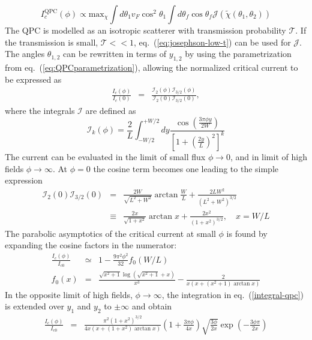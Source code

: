 \begin{equation}
I_c^{\text{QPC}}(\phi) \propto \text{max}_{\chi} \int d \theta_1 v_F \cos^2 \theta_1 \int d \theta_f \cos \theta_f \mathcal{J}\left( \tilde{\chi} (\theta_1, \theta_2) \right)
\end{equation}
The QPC is modelled as an isotropic scatterer with transmission probability $\mathcal{T}$. If the transmission is small, $\mathcal{T} << 1$, eq.~(\ref{eq:josephson-low-t}) can be used for $\mathcal{J}$.
The angles $\theta_{1, 2}$ can be rewritten in terms of $y_{1, 2}$ by using the parametrization from eq.~(\ref{eq:QPCparametrization}), allowing the normalized critical current to be expressed as
\begin{eqnarray}
\frac{I_c(\phi)}{I_c(0)} &=& \frac{\mathcal{I}_2(\phi)\mathcal{I}_{3/2}(\phi)}{\mathcal{I}_2(0)\mathcal{I}_{3/2}(0)},
\end{eqnarray}
where the integrals $\mathcal{I}$ are defined as
\begin{equation}
\mathcal{I}_k(\phi) = \frac{2}{L}\int_{-W/2}^{+W/2}dy \frac{\cos\left(\frac{3\pi\phi y}{2W}\right)}{\left[1 + \left(\frac{2y}{L}\right)^2 \right]^k}
\label{integral-qpc}
\end{equation}
The current can be evaluated in the limit of small flux $\phi \rightarrow 0$, and in limit of high fields $\phi \rightarrow \infty$. 
At $\phi=0$ the cosine term becomes one leading to the simple expression
\begin{eqnarray}
\mathcal{I}_2(0)\mathcal{I}_{3/2}(0) &=&
\frac{2 W}{\sqrt{L^2+W^2}}\arctan\frac{W}{L} + \frac{2 L W^2}{(L^2+W^2)^{3/2}} \\
&\equiv& \frac{2x}{\sqrt{1 + x^2}} \arctan x + \frac{2 x^2}{\left( 1 + x^2 \right)^{3/2}}, \quad x = W/L
\label{Ic-0}
\end{eqnarray}
The parabolic asymptotics of the critical current at small $\phi$ is found by expanding the cosine factors in the numerator:
\begin{eqnarray}
\frac{I_c(\phi)}{I_{c0}}&\simeq& 1 - \frac{9\pi ^2 \phi^2 }{32} f_0(W/L) \\
f_0(x) &=& \frac{\sqrt{x^2+1} \log \left(\sqrt{x^2+1}+x\right)}{x^3} - \frac{2}{x (x+(x^2+1) \arctan x)} 
\end{eqnarray}
In the opposite limit of high fields, $\phi\to \infty$, the integration in eq.~(\ref{integral-qpc}) is extended over $y_1$ and $y_2$ to $\pm \infty$ and obtain
\begin{eqnarray}
\frac{I_c(\phi)}{I_{c0}} &=& \frac{\pi^2 \left(1+x^2\right)^{3/2}}{4x\left(x + \left(1+x^2\right)\arctan x\right)}\left(1 + \frac{3 \pi \phi }{4 x} \right) \sqrt{\frac{3 \phi}{2x}}\exp\left(-\frac{3\phi\pi}{2x}\right)
\label{eq:large-phi}
\end{eqnarray}
\newpage

